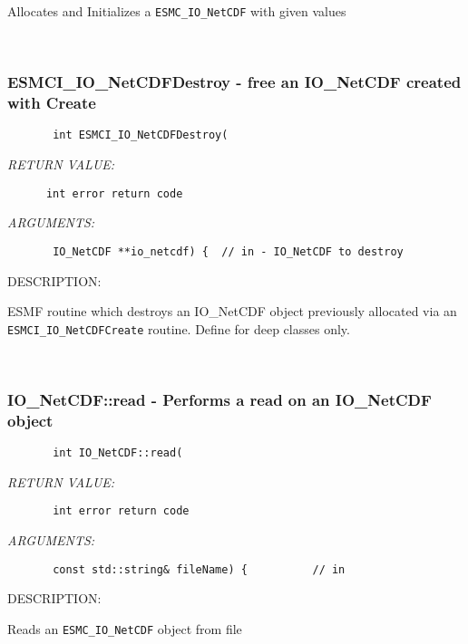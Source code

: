         Allocates and Initializes a {\tt ESMC\_IO\_NetCDF} with given values
   
 
\mbox{}\hrulefill\ 
 
\subsubsection [ESMCI\_IO\_NetCDFDestroy] {ESMCI\_IO\_NetCDFDestroy - free an IO\_NetCDF created with Create}


  
\begin{verbatim}       int ESMCI_IO_NetCDFDestroy(\end{verbatim}{\em RETURN VALUE:}
\begin{verbatim}      int error return code\end{verbatim}{\em ARGUMENTS:}
\begin{verbatim}       IO_NetCDF **io_netcdf) {  // in - IO_NetCDF to destroy\end{verbatim}
{\sf DESCRIPTION:\\ }


        ESMF routine which destroys an IO_NetCDF object previously allocated
        via an {\tt ESMCI\_IO\_NetCDFCreate} routine.  Define for deep classes only.
   
 
\mbox{}\hrulefill\ 
 
\subsubsection [IO\_NetCDF::read] {IO\_NetCDF::read - Performs a read on an IO\_NetCDF object}


  
\begin{verbatim}       int IO_NetCDF::read(\end{verbatim}{\em RETURN VALUE:}
\begin{verbatim}       int error return code\end{verbatim}{\em ARGUMENTS:}
\begin{verbatim}       const std::string& fileName) {          // in
 \end{verbatim}
{\sf DESCRIPTION:\\ }


        Reads an {\tt ESMC\_IO\_NetCDF} object from file
   
